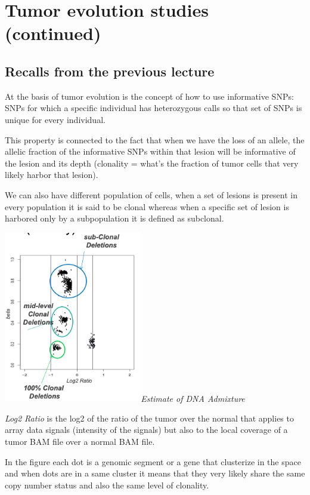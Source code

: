 \chapter{Tumor evolution studies (continued)}
\graphicspath{{chapters/TumorEvStudiesIIImages/}}

\section{Recalls from the previous lecture}

At the basis of tumor evolution is the concept of how to use {informative SNPs}:
SNPs for which a specific individual has heterozygous calls so that set of SNPs
is unique for every individual.

This property is connected to the fact that when we have the loss of an allele,
the allelic fraction of the informative SNPs within that lesion will be
informative of the lesion and its depth (clonality = what's the fraction of
tumor cells that very likely harbor that lesion).

We can also have different population of cells, when a set of lesions is present
in every population it is said to be clonal whereas when a specific set of
lesion is harbored only by a subpopulation it is defined as subclonal.

\includegraphics[width=2.37708in,height=2.94375in]{image1.png}\emph{Estimate of
DNA Admixture}

\emph{{Log2 Ratio}} is the log2 of the ratio of the tumor over the normal that
applies to array data signals (intensity of the signals) but also to the local
coverage of a tumor BAM file over a normal BAM file.

In the figure each dot is a genomic segment or a gene that clusterize in the
space and when dots are in a same cluster it means that they very likely share
the same copy number status and also the same level of clonality.

